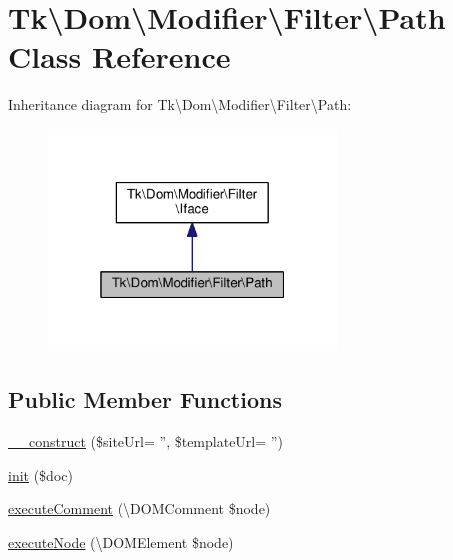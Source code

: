 \hypertarget{classTk_1_1Dom_1_1Modifier_1_1Filter_1_1Path}{\section{Tk\textbackslash{}Dom\textbackslash{}Modifier\textbackslash{}Filter\textbackslash{}Path Class Reference}
\label{classTk_1_1Dom_1_1Modifier_1_1Filter_1_1Path}
}


Inheritance diagram for Tk\textbackslash{}Dom\textbackslash{}Modifier\textbackslash{}Filter\textbackslash{}Path\+:\nopagebreak
\begin{figure}[H]
\begin{center}
\leavevmode
\includegraphics[width=217pt]{classTk_1_1Dom_1_1Modifier_1_1Filter_1_1Path__inherit__graph}
\end{center}
\end{figure}
\subsection*{Public Member Functions}
\begin{DoxyCompactItemize}
\item 
\hyperlink{classTk_1_1Dom_1_1Modifier_1_1Filter_1_1Path_a7e1c8692f0f02373e4dbd287585fc5d2}{\+\_\+\+\_\+construct} (\$site\+Url= '', \$template\+Url= '')
\item 
\hyperlink{classTk_1_1Dom_1_1Modifier_1_1Filter_1_1Path_a26bb34d7f1973f22636800fb6fe100fc}{init} (\$doc)
\item 
\hyperlink{classTk_1_1Dom_1_1Modifier_1_1Filter_1_1Path_a5981879c0bbebde547aa856b9a6aa6e6}{execute\+Comment} (\textbackslash{}D\+O\+M\+Comment \$node)
\item 
\hyperlink{classTk_1_1Dom_1_1Modifier_1_1Filter_1_1Path_ab02881d6db88ca04edf90cb92186486e}{execute\+Node} (\textbackslash{}D\+O\+M\+Element \$node)
\end{DoxyCompactItemize}
